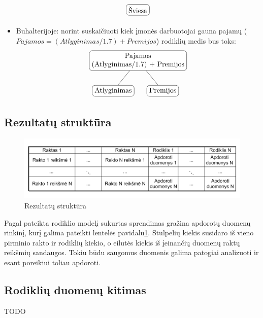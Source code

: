 \documentclass{VUMIFPSbakalaurinis}
\begin{document}
\begin{itemize}
\[\begin{tikzpicture}[sibling distance=7em, every node/.style = {shape=rectangle, rounded                                corners, draw, align=center,	
                                top color=white, bottom color=white}]
            \node{Šviesa};
        \end{tikzpicture} 	
    \]
    \item Buhalterijoje: norint suskaičiuoti kiek įmonės darbuotojai gauna pajamų (\(\textit{Pajamos} = (\textit{Atlyginimas}/1.7) + \textit{Premijos}\)) rodiklių medis bus toks: 
    \[	
        \begin{tikzpicture}[sibling distance=7em,	
            every node/.style = {shape=rectangle, rounded corners,	
                                 draw, align=center,	
                                 top color=white, bottom color=white}]	
            \node {Pajamos\\(Atlyginimas/1.7) + Premijos}	
                    child { node {Atlyginimas} }	
                    child { node {Premijos} } ;	
        \end{tikzpicture} 	
    \]
\end{itemize}  


\subsection{Rezultatų struktūra}

\begin{figure}[H]
    \centering
    \includegraphics[width=1\textwidth]{img/rezultatai.png}
    \caption{Rezultatų struktūra}
    \label{img:rezultatai}
\end{figure}

Pagal pateikta rodiklio modelį sukurtas sprendimas gražina apdorotų duomenų rinkinį, kurį galima pateikti lentelės pavidalu\ref{img:rezultatai}.  Stulpelių kiekis susidaro iš vieno pirminio rakto ir rodiklių kiekio, o eilutės kiekis iš įeinančių duomenų raktų reikšmių sandaugos. Tokiu būdu saugomus duomenis galima patogiai analizuoti ir esant poreikiui toliau apdoroti.


\subsection{Rodiklių duomenų kitimas}

TODO
\end{document}
